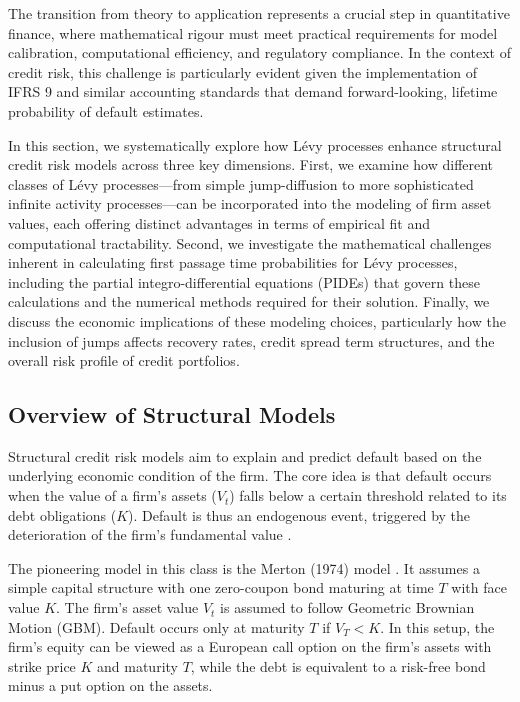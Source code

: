 \documentclass[11pt,twoside,openright]{report}
\begin{document}
The transition from theory to application represents a crucial step in quantitative finance, where mathematical rigour must meet practical requirements for model calibration, computational efficiency, and regulatory compliance. In the context of credit risk, this challenge is particularly evident given the implementation of IFRS 9 and similar accounting standards that demand forward-looking, lifetime probability of default estimates.

In this section, we systematically explore how Lévy processes enhance structural credit risk models across three key dimensions. First, we examine how different classes of Lévy processes—from simple jump-diffusion to more sophisticated infinite activity processes—can be incorporated into the modeling of firm asset values, each offering distinct advantages in terms of empirical fit and computational tractability. Second, we investigate the mathematical challenges inherent in calculating first passage time probabilities for Lévy processes, including the partial integro-differential equations (PIDEs) that govern these calculations and the numerical methods required for their solution. Finally, we discuss the economic implications of these modeling choices, particularly how the inclusion of jumps affects recovery rates, credit spread term structures, and the overall risk profile of credit portfolios.

\subsection{Overview of Structural Models}
\label{subsec:overview_structural}

Structural credit risk models aim to explain and predict default based on the underlying economic condition of the firm. The core idea is that default occurs when the value of a firm's assets ($V_t$) falls below a certain threshold related to its debt obligations ($K$). Default is thus an endogenous event, triggered by the deterioration of the firm's fundamental value \cite{schoutens2010levy}.

The pioneering model in this class is the Merton (1974) model \cite{merton1974pricing}. It assumes a simple capital structure with one zero-coupon bond maturing at time $T$ with face value $K$. The firm's asset value $V_t$ is assumed to follow Geometric Brownian Motion (GBM). Default occurs only at maturity $T$ if $V_T < K$. In this setup, the firm's equity can be viewed as a European call option on the firm's assets with strike price $K$ and maturity $T$, while the debt is equivalent to a risk-free bond minus a put option on the assets.
\end{document}
